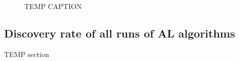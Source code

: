\begin{figure}[!htb]
\centering
{}
\caption{\label{fig:iro2_al}
TEMP CAPTION
}
\end{figure}


\subsection{Discovery rate of all runs of AL algorithms} %
%
TEMP section


